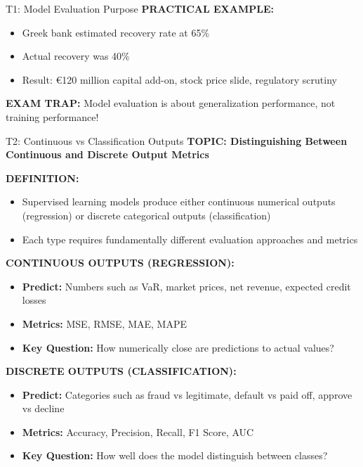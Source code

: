 \documentclass[8pt]{beamer}
\begin{document}
\begin{frame}{T1: Model Evaluation Purpose}
		\vspace{0.1cm}
		\textbf{PRACTICAL EXAMPLE:}
		\begin{itemize}
			\item Greek bank estimated recovery rate at 65\%
			\item Actual recovery was 40\%
			\item Result: €120 million capital add-on, stock price slide, regulatory scrutiny
		\end{itemize}
		
		\textcolor{myred}{\textbf{EXAM TRAP:}} Model evaluation is about \textcolor{myblue}{generalization performance}, not training performance!
	\end{frame}
	
	\begin{frame}{T2: Continuous vs Classification Outputs}
		\fontsize{6.5}{7.5}\selectfont
		\textbf{TOPIC: Distinguishing Between Continuous and Discrete Output Metrics}
		
		\vspace{0.1cm}
		\textbf{DEFINITION:}
		\begin{itemize}
			\item Supervised learning models produce either continuous numerical outputs (regression) or discrete categorical outputs (classification)
			\item Each type requires fundamentally different evaluation approaches and metrics
		\end{itemize}
		
		\vspace{0.1cm}
		\textbf{CONTINUOUS OUTPUTS (REGRESSION):}
		\begin{itemize}
			\item \textbf{Predict:} Numbers such as VaR, market prices, net revenue, expected credit losses
			\item \textbf{Metrics:} MSE, RMSE, MAE, MAPE
			\item \textbf{Key Question:} How numerically close are predictions to actual values?
		\end{itemize}
		
		\vspace{0.1cm}
		\textbf{DISCRETE OUTPUTS (CLASSIFICATION):}
		\begin{itemize}
			\item \textbf{Predict:} Categories such as fraud vs legitimate, default vs paid off, approve vs decline
			\item \textbf{Metrics:} Accuracy, Precision, Recall, F1 Score, AUC
			\item \textbf{Key Question:} How well does the model distinguish between classes?
		\end{itemize}
		

\end{frame}
\end{document}
